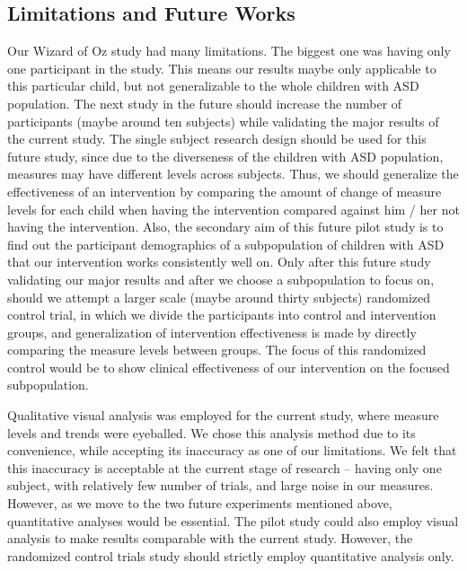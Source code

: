 \subsection{Limitations and Future Works}
Our Wizard of Oz study had many limitations.  The biggest one was having only one participant in the study.  This means our results maybe only applicable to this particular child, but not generalizable to the whole children with ASD population.  The next study in the future should increase the number of participants (maybe around ten subjects) while validating the major results of the current study.  The single subject research design should be used for this future study, since due to the diverseness of the children with ASD population, measures may have different levels across subjects.  Thus, we should generalize the effectiveness of an intervention by comparing the amount of change of measure levels for each child when having the intervention compared against him / her not having the intervention.  Also, the secondary aim of this future pilot study is to find out the participant demographics of a subpopulation of children with ASD that our intervention works consistently well on.  Only after this future study validating our major results and after we choose a subpopulation to focus on, should we attempt a larger scale (maybe around thirty subjects) randomized control trial, in which we divide the participants into control and intervention groups, and generalization of intervention effectiveness is made by directly comparing the measure levels between groups.  The focus of this randomized control would be to show clinical effectiveness of our intervention on the focused subpopulation.

Qualitative visual analysis was employed for the current study, where measure levels and trends were eyeballed.  We chose this analysis method due to its convenience, while accepting its inaccuracy as one of our limitations.  We felt that this inaccuracy is acceptable at the current stage of research -- having only one subject, with relatively few number of trials, and large noise in our measures.  However, as we move to the two future experiments mentioned above, quantitative analyses would be essential.  The pilot study could also employ visual analysis to make results comparable with the current study.  However, the randomized control trials study should strictly employ quantitative analysis only.

